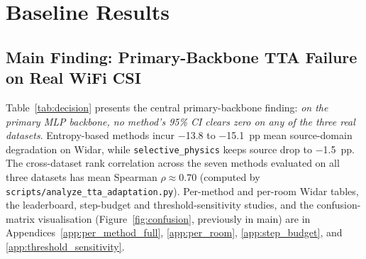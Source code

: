 \section{Baseline Results}

\subsection{Main Finding: Primary-Backbone TTA Failure on Real WiFi CSI}

\begin{table}[t]
\centering
\caption{Decision table (primary MLP backbone, $n{=}15$ per method). For each dataset we report source-only accuracy, the best and worst TTA method (mean gain and 95\% bootstrap CI for best; gain only for worst), the negative-adaptation rate of the best method, and the source-domain drop of that method. On the primary MLP, no method's 95\% CI clears zero on any real dataset; \texttt{selective\_physics} is consistently least harmful. Full per-method tables per dataset are in Appendix~\ref{app:per_method_full}.}
\label{tab:decision}
\small
\setlength{\tabcolsep}{4pt}
\end{table}

Table~\ref{tab:decision} presents the central primary-backbone finding: \emph{on the primary MLP backbone, no method's 95\% CI clears zero on any of the three real datasets}. Entropy-based methods incur $-$13.8 to $-$15.1~pp mean source-domain degradation on Widar, while \texttt{selective\_physics} keeps source drop to $-$1.5~pp. The cross-dataset rank correlation across the seven methods evaluated on all three datasets has mean Spearman $\rho{\approx}0.70$ (computed by \texttt{scripts/analyze\_tta\_adaptation.py}). Per-method and per-room Widar tables, the leaderboard, step-budget and threshold-sensitivity studies, and the confusion-matrix visualisation (Figure~\ref{fig:confusion}, previously in main) are in Appendices~\ref{app:per_method_full}, \ref{app:per_room}, \ref{app:step_budget}, and \ref{app:threshold_sensitivity}.

